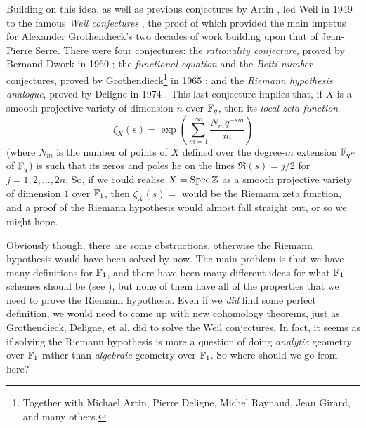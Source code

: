     Building on this idea, as well as previous conjectures by Artin \cite{Artin:1924ie}, led Weil in 1949 to the famous \emph{Weil conjectures} \cite{Weil:1949tx}, the proof of which provided the main impetus for Alexander Grothendieck's two decades of work building upon that of Jean-Pierre Serre.
    There were four conjectures: the \emph{rationality conjecture}, proved by Bernand Dwork in 1960 \cite{Dwork:1960ul}; the \emph{functional equation} and the \emph{Betti number} conjectures, proved by Grothendieck\footnote{
        Together with Michael Artin, Pierre Deligne, Michel Raynaud, Jean Girard, and many others.
    } in 1965 \cite{FormuledeLefschetz:1965vd,Cohomologieladique:1965uc}; and the \emph{Riemann hypothesis analogue}, proved by Deligne in 1974 \cite{Deligne:1974vf}.
    This last conjecture implies that, if $X$ is a smooth projective variety of dimension $n$ over $\mathbb{F}_q$, then its \emph{local zeta function}
    \begin{equation*}
        \zeta_X(s)=\exp\left(\sum_{m=1}^\infty\frac{N_m q^{-sm}}{m}\right)
    \end{equation*}
    (where $N_m$ is the number of points of $X$ defined over the degree-$m$ extension $\mathbb{F}_{q^m}$ of $\mathbb{F}_q$) is such that its zeros and poles lie on the lines $\Re(s)=j/2$ for $j=1,2,\ldots,2n$.
    So, if we could realise $X=\operatorname{Spec}\mathbb{Z}$ as a smooth projective variety of dimension $1$ over $\mathbb{F}_1$, then $\zeta_X(s)=$ would be the Riemann zeta function, and a proof of the Riemann hypothesis would almost fall straight out, or so we might hope.

    \bigskip

    Obviously though, there are some obstructions, otherwise the Riemann hypothesis would have been solved by now.
    The main problem is that we have many definitions for $\mathbb{F}_1$, and there have been many different ideas for what $\mathbb{F}_1$-schemes should be (see \cite{Pena:2009vb}), but none of them have all of the properties that we need to prove the Riemann hypothesis.
    Even if we \emph{did} find some perfect definition, we would need to come up with new cohomology theorems, just as Grothendieck, Deligne, et al. did to solve the Weil conjectures.
    In fact, it seems as if solving the Riemann hypothesis is more a question of doing \emph{analytic} geometry over $\mathbb{F}_1$ rather than \emph{algebraic} geometry over $\mathbb{F}_1$.
    So where should we go from here?


